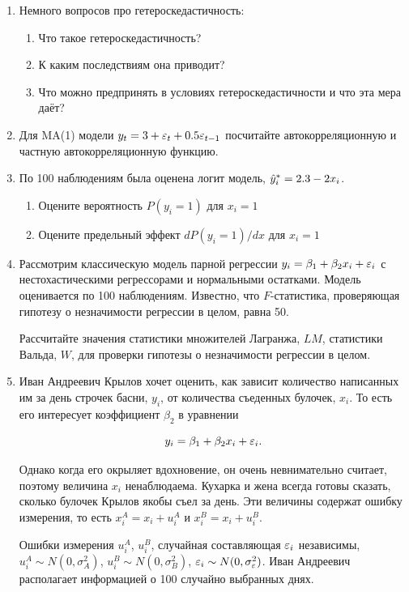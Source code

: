 \documentclass[12pt, a4paper]{article}
\begin{document}
\begin{enumerate}
\item Немного вопросов про гетероскедастичность:
\begin{enumerate}
\item Что такое гетероскедастичность?
\item К каким последствиям она приводит?
\item Что можно предпринять в условиях гетероскедастичности и что эта мера даёт?
\end{enumerate}

\item Для MA(1) модели $y_t=3+\varepsilon_t+0.5\varepsilon_{t-1}$ посчитайте автокорреляционную и частную автокорреляционную функцию.

\item По 100 наблюдениям была оценена логит модель, $\hat{y}_i^*=2.3-2x_i$.
\begin{enumerate}
\item Оцените вероятность $P(y_i=1)$ для $x_i=1$
\item Оцените предельный эффект $dP(y_i=1)/dx$ для $x_i=1$
\end{enumerate}

\item Рассмотрим классическую модель парной регрессии $y_i=\beta_1 + \beta_2 x_i + \varepsilon_i$ с нестохастическими регрессорами и нормальными остатками. Модель оценивается по 100 наблюдениям. Известно, что $F$-статистика, проверяющая гипотезу о незначимости регрессии в целом, равна 50.

Рассчитайте значения статистики множителей Лагранжа, $LM$, статистики Вальда, $W$, для проверки гипотезы о незначимости регрессии в целом.


\item Иван Андреевич Крылов хочет оценить, как зависит количество написанных им за день строчек басни, $y_i$, от количества съеденных булочек, $x_i$. То есть его интересует коэффициент $\beta_2$ в уравнении

\[
y_i=\beta_1+\beta_2 x_i + \varepsilon_i.
\]

Однако когда его окрыляет вдохновение, он очень невнимательно считает, поэтому величина $x_i$ ненаблюдаема. Кухарка и жена всегда готовы сказать, сколько булочек Крылов якобы съел за день. Эти величины содержат ошибку измерения, то есть $x_i^A=x_i+u_i^A$ и $x_i^B=x_i+u_i^B$.

Ошибки измерения $u_i^A$, $u_i^B$, случайная составляющая $\varepsilon_i$ независимы, $u_i^A \sim N(0,\sigma^2_A)$, $u_i^B \sim N(0,\sigma^2_B)$, $\varepsilon_i \sim N(0,\sigma^2_{\varepsilon})$. Иван Андреевич располагает информацией о 100 случайно выбранных днях.


\end{enumerate}
\end{document}
